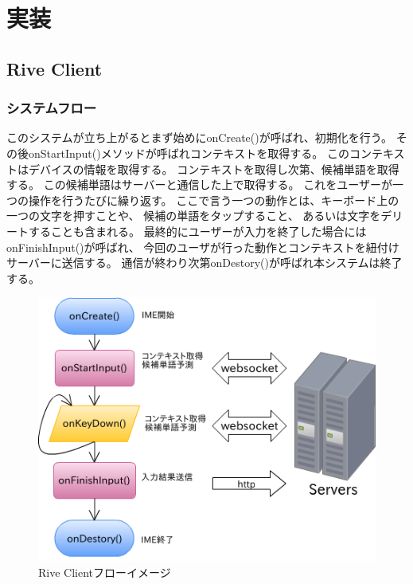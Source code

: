 \chapter{実装}
\label{implementation}

\section{Rive Client}
\subsection{システムフロー}

このシステムが立ち上がるとまず始めにonCreate()が呼ばれ、初期化を行う。
その後onStartInput()メソッドが呼ばれコンテキストを取得する。
このコンテキストはデバイスの情報を取得する。
コンテキストを取得し次第、候補単語を取得する。
この候補単語はサーバーと通信した上で取得する。
これをユーザーが一つの操作を行うたびに繰り返す。
ここで言う一つの動作とは、キーボード上の一つの文字を押すことや、
候補の単語をタップすること、
あるいは文字をデリートすることも含まれる。
最終的にユーザーが入力を終了した場合にはonFinishInput()が呼ばれ、
今回のユーザが行った動作とコンテキストを紐付けサーバーに送信する。
通信が終わり次第onDestory()が呼ばれ本システムは終了する。

\begin{figure}[htbp]
  \begin{center}
    \includegraphics[width=14cm,bb=0 0 469 366]{images/clientflow}
  \end{center}
  \caption{Rive Clientフローイメージ}
  \label{fig:clientflow}
\end{figure}

